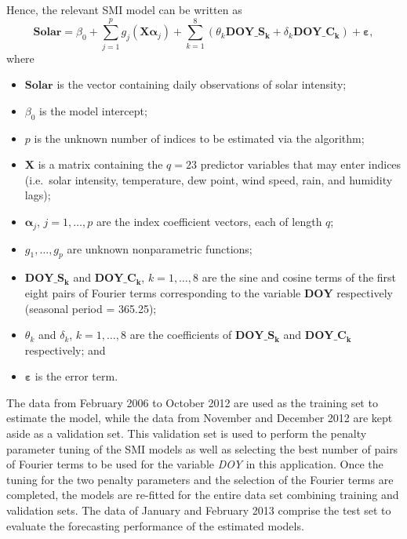\documentclass[
  11pt,
  a4paper,
]{article}
\providecommand{\tightlist}{%
  \setlength{\itemsep}{0pt}\setlength{\parskip}{0pt}}\usepackage{longtable,booktabs,array}
\begin{document}
Hence, the relevant SMI model can be written as \[
  \textbf{Solar} = \beta_{0} + \sum_{j = 1}^{p}{g_{j}(\bm{X}\bm{\alpha}_{j})} + \sum_{k = 1}^{8}(\theta_{k}\textbf{DOY}\_\textbf{S}_{\bm{k}} + \delta_{k}\textbf{DOY}\_\textbf{C}_{\bm{k}}) + \bm{\varepsilon},
\] where

\begin{itemize}
\tightlist
\item
  \(\textbf{Solar}\) is the vector containing daily observations of
  solar intensity;
\item
  \(\beta_{0}\) is the model intercept;
\item
  \(p\) is the unknown number of indices to be estimated via the
  algorithm;
\item
  \(\bm{X}\) is a matrix containing the \(q=23\) predictor variables
  that may enter indices (i.e.~solar intensity, temperature, dew point,
  wind speed, rain, and humidity lags);
\item
  \(\bm{\alpha}_{j}\), \(j = 1, \dots, p\) are the index coefficient
  vectors, each of length \(q\);
\item
  \(g_{1}, \dots, g_{p}\) are unknown nonparametric functions;
\item
  \(\textbf{DOY}\_\textbf{S}_{\bm{k}}\) and
  \(\textbf{DOY}\_\textbf{C}_{\bm{k}}\), \(k = 1, \dots, 8\) are the
  sine and cosine terms of the first eight pairs of Fourier terms
  corresponding to the variable \(\textbf{DOY}\) respectively (seasonal
  period = 365.25);
\item
  \(\theta_{k}\) and \(\delta_{k}\), \(k = 1, \dots, 8\) are the
  coefficients of \(\textbf{DOY}\_\textbf{S}_{\bm{k}}\) and
  \(\textbf{DOY}\_\textbf{C}_{\bm{k}}\) respectively; and
\item
  \(\bm{\varepsilon}\) is the error term.
\end{itemize}

The data from February 2006 to October 2012 are used as the training set
to estimate the model, while the data from November and December 2012
are kept aside as a validation set. This validation set is used to
perform the penalty parameter tuning of the SMI models as well as
selecting the best number of pairs of Fourier terms to be used for the
variable \emph{DOY} in this application. Once the tuning for the two
penalty parameters and the selection of the Fourier terms are completed,
the models are re-fitted for the entire data set combining training and
validation sets. The data of January and February 2013 comprise the test
set to evaluate the forecasting performance of the estimated models.
\end{document}
